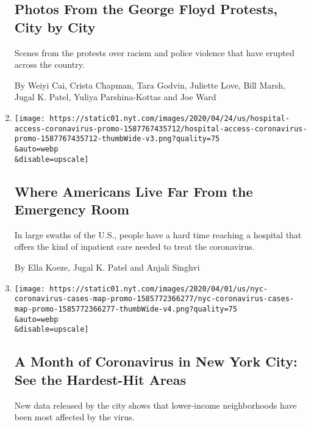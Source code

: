 \begin{enumerate}
  \hypertarget{photos-from-the-george-floyd-protests-city-by-city}{%
  \subsection{Photos From the George Floyd Protests, City by
  City}\label{photos-from-the-george-floyd-protests-city-by-city}}

  Scenes from the protests over racism and police violence that have
  erupted across the country.

  By Weiyi Cai, Crista Chapman, Tara Godvin, Juliette Love, Bill Marsh,
  Jugal K. Patel, Yuliya Parshina-Kottas and Joe Ward
\item
  \href{/interactive/2020/04/26/us/us-hospital-access-coronavirus.html}{}

  \texttt{[image: https://static01.nyt.com/images/2020/04/24/us/hospital-access-coronavirus-promo-1587767435712/hospital-access-coronavirus-promo-1587767435712-thumbWide-v3.png?quality=75\\\&auto=webp\\\&disable=upscale]}

  \hypertarget{where-americans-live-far-from-the-emergency-room}{%
  \subsection{Where Americans Live Far From the Emergency
  Room}\label{where-americans-live-far-from-the-emergency-room}}

  In large swaths of the U.S., people have a hard time reaching a
  hospital that offers the kind of inpatient care needed to treat the
  coronavirus.

  By Ella Koeze, Jugal K. Patel and Anjali Singhvi
\item
  \href{/interactive/2020/04/01/nyregion/nyc-coronavirus-cases-map.html}{}

  \texttt{[image: https://static01.nyt.com/images/2020/04/01/us/nyc-coronavirus-cases-map-promo-1585772366277/nyc-coronavirus-cases-map-promo-1585772366277-thumbWide-v4.png?quality=75\\\&auto=webp\\\&disable=upscale]}

  \hypertarget{a-month-of-coronavirus-in-new-york-city-see-the-hardest-hit-areas}{%
  \subsection{A Month of Coronavirus in New York City: See the
  Hardest-Hit
  Areas}\label{a-month-of-coronavirus-in-new-york-city-see-the-hardest-hit-areas}}

  New data released by the city shows that lower-income neighborhoods
  have been most affected by the virus.


\end{enumerate}
